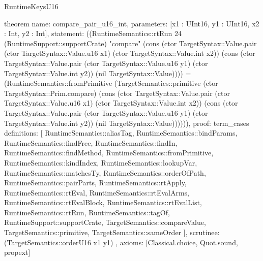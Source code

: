 \begin{lexlean}{RuntimeKeysU16}
\begin{semanticmodule}
theorem{
  name: compare_pair_u16_int,
  parameters: [x1 : UInt16, y1 : UInt16, x2 : Int, y2 : Int],
  statement: ((RuntimeSemantics::rtRun 24 (RuntimeSupport::supportCrate) "compare" (cons (ctor TargetSyntax::Value.pair (ctor TargetSyntax::Value.u16 x1) (ctor TargetSyntax::Value.int x2)) (cons (ctor TargetSyntax::Value.pair (ctor TargetSyntax::Value.u16 y1) (ctor TargetSyntax::Value.int y2)) (nil TargetSyntax::Value)))) = (RuntimeSemantics::fromPrimitive (TargetSemantics::primitive (ctor TargetSyntax::Prim.compare) (cons (ctor TargetSyntax::Value.pair (ctor TargetSyntax::Value.u16 x1) (ctor TargetSyntax::Value.int x2)) (cons (ctor TargetSyntax::Value.pair (ctor TargetSyntax::Value.u16 y1) (ctor TargetSyntax::Value.int y2)) (nil TargetSyntax::Value)))))),
  proof: term_cases{
    definitions: [
      RuntimeSemantics::aliasTag,
      RuntimeSemantics::bindParams,
      RuntimeSemantics::findFree,
      RuntimeSemantics::findIn,
      RuntimeSemantics::findMethod,
      RuntimeSemantics::fromPrimitive,
      RuntimeSemantics::kindIndex,
      RuntimeSemantics::lookupVar,
      RuntimeSemantics::matchesTy,
      RuntimeSemantics::orderOfPath,
      RuntimeSemantics::pairParts,
      RuntimeSemantics::rtApply,
      RuntimeSemantics::rtEval,
      RuntimeSemantics::rtEvalArms,
      RuntimeSemantics::rtEvalBlock,
      RuntimeSemantics::rtEvalList,
      RuntimeSemantics::rtRun,
      RuntimeSemantics::tagOf,
      RuntimeSupport::supportCrate,
      TargetSemantics::compareValue,
      TargetSemantics::primitive,
      TargetSemantics::sameOrder
    ],
    scrutinee: (TargetSemantics::orderU16 x1 y1)
  },
  axioms: [Classical.choice, Quot.sound, propext]
}


\end{semanticmodule}
\end{lexlean}

